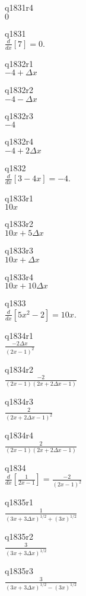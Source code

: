 q1831r4\\
\(\displaystyle 0 \)

q1831\\
\(\displaystyle \frac{d}{dx}[7] = 0. \)

q1832r1\\
\(\displaystyle -4 + \Delta x \)

q1832r2\\
\(\displaystyle -4 - \Delta x \)

q1832r3\\
\(\displaystyle -4 \)

q1832r4\\
\(\displaystyle -4 + 2\Delta x \)

q1832\\
\(\displaystyle \frac{d}{dx}[3-4x] = -4. \)

q1833r1\\
\(\displaystyle 10x \)

q1833r2\\
\(\displaystyle 10x + 5\Delta x \)

q1833r3\\
\(\displaystyle 10x + \Delta x \)

q1833r4\\
\(\displaystyle 10x + 10\Delta x \)

q1833\\
\(\displaystyle \frac{d}{dx}[5x^2 - 2] = 10x. \)

q1834r1\\
\(\displaystyle \frac{-2\Delta x}{(2x-1)^2} \)

q1834r2\\
\(\displaystyle \frac{-2}{(2x-1)(2x + 2\Delta x - 1)} \)

q1834r3\\
\(\displaystyle \frac{2}{(2x + 2\Delta x - 1)^2} \)

q1834r4\\
\(\displaystyle \frac{2}{(2x-1)(2x + 2\Delta x - 1)} \)

q1834\\
\(\displaystyle \frac{d}{dx} \left [ \frac{1}{2x-1} \right ] = \frac{-2}{(2x-1)^2} \)

q1835r1\\
\(\displaystyle \frac{1}{(3x + 3\Delta x)^{1/2} + (3x)^{1/2}} \)

q1835r2\\
\(\displaystyle \frac{3}{(3x + 3\Delta x)^{1/2}} \)

q1835r3\\
\(\displaystyle \frac{3}{(3x + 3\Delta x)^{1/2} - (3x)^{1/2}} \)

